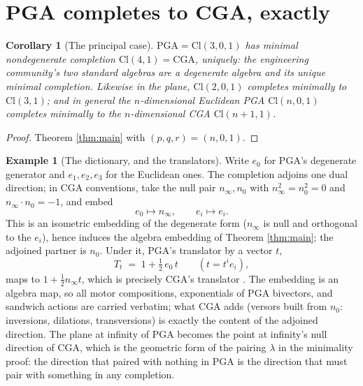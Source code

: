 \documentclass[11pt]{article}
\newtheorem{corollary}[theorem]{Corollary}
\theoremstyle{definition}
\newtheorem{example}[theorem]{Example}
\newcommand{\Cl}{\mathrm{Cl}}
\newcommand{\nO}{n_0}
\newcommand{\nInf}{n_\infty}
\begin{document}
\section{PGA completes to CGA, exactly}\label{sec:pga}

\begin{corollary}[The principal case]\label{cor:pga}
$\mathrm{PGA} = \Cl(3,0,1)$ has minimal nondegenerate completion $\Cl(4,1) = \mathrm{CGA}$, uniquely: the engineering community's two standard algebras are a degenerate algebra and its unique minimal completion. Likewise in the plane, $\Cl(2,0,1)$ completes minimally to $\Cl(3,1)$; and in general the $n$-dimensional Euclidean PGA $\Cl(n,0,1)$ completes minimally to the $n$-dimensional CGA $\Cl(n{+}1,1)$.
\end{corollary}

\begin{proof}
Theorem \ref{thm:main} with $(p,q,r) = (n,0,1)$.
\end{proof}

\begin{example}[The dictionary, and the translators]\label{ex:dictionary}
Write $e_0$ for PGA's degenerate generator and $e_1, e_2, e_3$ for the Euclidean ones. The completion adjoins one dual direction; in CGA conventions, take the null pair $\nInf, \nO$ with $\nInf^2 = \nO^2 = 0$ and $\nInf \cdot \nO = -1$, and embed
\[
e_0 \longmapsto \nInf, \qquad e_i \longmapsto e_i .
\]
This is an isometric embedding of the degenerate form ($\nInf$ is null and orthogonal to the $e_i$), hence induces the algebra embedding of Theorem \ref{thm:main}; the adjoined partner is $\nO$. Under it, PGA's translator by a vector $t$,
\[
T_t \;=\; 1 + \tfrac12\, e_0\, t \qquad (t = t^i e_i),
\]
maps to $1 + \tfrac12 \nInf t$, which is precisely CGA's translator \cite{DFM2007}. The embedding is an algebra map, so all motor compositions, exponentials of PGA bivectors, and sandwich actions are carried verbatim; what CGA adds (versors built from $\nO$: inversions, dilations, transversions) is exactly the content of the adjoined direction. The plane at infinity of PGA becomes the point at infinity's null direction of CGA, which is the geometric form of the pairing $\lambda$ in the minimality proof: the direction that paired with nothing in PGA is the direction that must pair with something in any completion.
\end{example}
\end{document}
